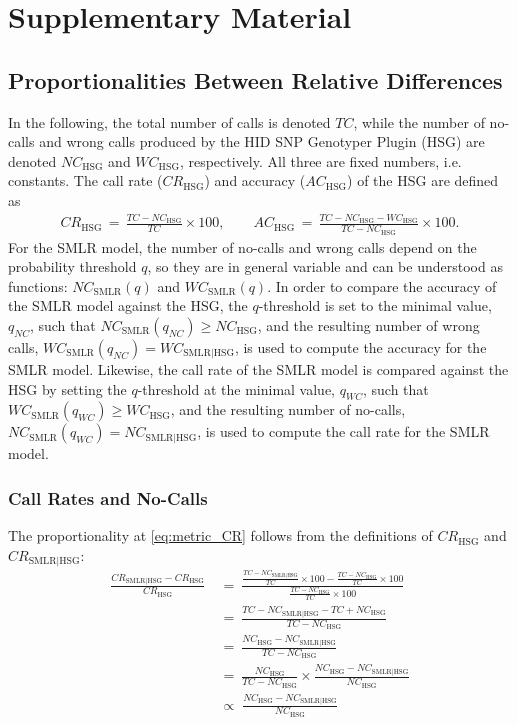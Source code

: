 \documentclass[preprint,5p,times,11pt]{elsarticle}
\begin{document}
\section*{Supplementary Material}

\subsection*{Proportionalities Between Relative Differences}
In the following, the total number of calls is denoted $TC$, while the number of no-calls and wrong calls produced by the HID SNP Genotyper Plugin (HSG) are denoted $NC_{\text{HSG}}$ and $WC_{\text{HSG}}$, respectively.
All three are fixed numbers, i.e. constants.
The call rate ($CR_{\text{HSG}}$) and accuracy ($AC_{\text{HSG}}$) of the HSG are defined as
\begin{align*}
CR_{\text{HSG}} \, = \, \frac{TC - NC_{\text{HSG}}}{TC} \times 100, \qquad
AC_{\text{HSG}} \, = \, \frac{TC - NC_{\text{HSG}} - WC_{\text{HSG}}}{TC - NC_{\text{HSG}}} \times 100.
\end{align*}
For the SMLR model, the number of no-calls and wrong calls depend on the probability threshold $q$, so they are in general variable and can be understood as functions: $NC_{\text{SMLR}}(q)$ and $WC_{\text{SMLR}}(q)$.
In order to compare the accuracy of the SMLR model against the HSG, the $q$-threshold is set to the minimal value, $q_{NC}$, such that $NC_{\text{SMLR}}(q_{NC}) \geq NC_{\text{HSG}}$, and the resulting number of wrong calls, $WC_{\text{SMLR}}(q_{NC}) = WC_{\text{SMLR}\mid\text{HSG}}$, is used to compute the accuracy for the SMLR model.
Likewise, the call rate of the SMLR model is compared against the HSG by setting the $q$-threshold at the minimal value, $q_{WC}$, such that $WC_{\text{SMLR}}(q_{WC}) \geq WC_{\text{HSG}}$, and the resulting number of no-calls, $NC_{\text{SMLR}}(q_{WC}) = NC_{\text{SMLR}\mid\text{HSG}}$, is used to compute the call rate for the SMLR model.

\subsubsection*{Call Rates and No-Calls}
The proportionality at \eqref{eq:metric_CR} follows from the definitions of $CR_{\text{HSG}}$ and $CR_{\text{SMLR}\mid\text{HSG}}$:
\begin{align}
\frac{CR_{\text{SMLR}\mid\text{HSG}} - CR_{\text{HSG}}}{CR_{\text{HSG}}}
\ &= \ 
\frac{\frac{TC - NC_{\text{SMLR}\mid\text{HSG}}}{TC} \times 100 - \frac{TC - NC_{\text{HSG}}}{TC} \times 100}{\frac{TC - NC_{\text{HSG}}}{TC} \times 100} \nonumber\\
&= \ 
\frac{TC - NC_{\text{SMLR}\mid\text{HSG}} - TC + NC_{\text{HSG}}}{TC - NC_{\text{HSG}}} \nonumber\\
&= \ 
\frac{NC_{\text{HSG}} - NC_{\text{SMLR}\mid\text{HSG}}}{TC - NC_{\text{HSG}}} \nonumber\\
&= \ 
\frac{NC_{\text{HSG}}}{TC - NC_{\text{HSG}}} \times \frac{NC_{\text{HSG}} - NC_{\text{SMLR}\mid\text{HSG}}}{NC_{\text{HSG}}} \nonumber\\
\; &\propto \; 
\frac{NC_{\text{HSG}} - NC_{\text{SMLR}\mid\text{HSG}}}{NC_{\text{HSG}}}\label{eq:prop_CR}
\end{align}
\end{document}
